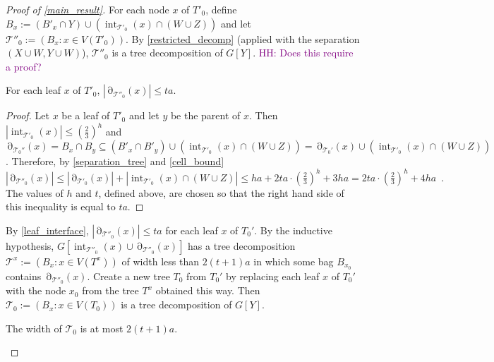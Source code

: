 \documentclass{patmorin}
\DeclareMathOperator{\interior}{int}
\DeclareMathOperator{\boundary}{\partial}
\newcommand{\hussein}[1]{\textcolor{purple}{HH: #1}}
\begin{document}
\begin{proof}[Proof of \cref{main_result}]
 For each node $x$ of $T'_0$, define $B_x:=(B'_x\cap Y) \cup (\interior_{\mathcal{T}'_0}(x)\cap (W\cup Z))$ and let $\mathcal{T}''_0:=(B_x:x\in V(T'_0))$.  By \cref{restricted_decomp} (applied with the separation $(X\cup W,Y\cup W)$), $\mathcal{T}''_0$ is a tree decomposition of $G[Y]$. \hussein{Does this require a proof?}

 \begin{clm}\label{leaf_interface}
    For each leaf $x$ of $T'_0$, $|\boundary_{\mathcal{T}''_0}(x)|\le ta$.
 \end{clm}

 \begin{proof}
   Let $x$ be a leaf of $T'_0$ and let $y$ be the parent of $x$.  Then $|\interior_{\mathcal{T}'_0}(x)|\le (\tfrac{2}{3})^h$ and $\boundary_{\mathcal{T}_0''}(x)=B_x\cap B_y\subseteq (B'_x\cap B'_y)\cup(\interior_{\mathcal{T}'_0}(x)\cap (W\cup Z)) = \boundary_{\mathcal{T}_0'}(x)\cup(\interior_{\mathcal{T}'_0}(x)\cap (W\cup Z))$. Therefore, by \cref{separation_tree} and \cref{cell_bound}
   \[
     |\boundary_{\mathcal{T}''_0}(x)| \le |\boundary_{\mathcal{T}'_0}(x)| + |\interior_{\mathcal{T}'_0}(x)\cap (W\cup Z)| \le ha + 2ta\cdot(\tfrac{2}{3})^{h} + 3ha =  2ta\cdot(\tfrac{2}{3})^{h} + 4ha\enspace .
   \]
   The values of $h$ and $t$, defined above, are chosen so that the right hand side of this inequality is equal to $ta$.
 \end{proof}

  By \cref{leaf_interface}, $|\boundary_{\mathcal{T}''_0}(x)|\le ta$ for each leaf $x$ of $T_0'$.  By the inductive hypothesis, $G[\interior_{\mathcal{T}''_0}(x)\cup\boundary_{\mathcal{T}''_0}(x)]$ has a tree decomposition $\mathcal{T}^x:=(B_x:x\in V(T^x))$ of width less than $2(t+1)a$ in which some bag $B_{x_0}$ contains  $\boundary_{\mathcal{T}''_0}(x)$. Create a new tree $T_0$ from $T_0'$ by replacing each leaf $x$ of $T_0'$ with the node $x_0$ from the tree $T^x$ obtained this way.  Then $\mathcal{T}_0:=(B_x:x\in V(T_0))$ is a tree decomposition of $G[Y]$.
  \begin{clm}\label{treewidth_bound}
     The width of $\mathcal{T}_0$ is at most $2(t+1)a$.
  \end{clm}



\end{proof}
\end{document}

